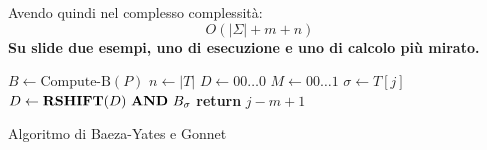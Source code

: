 \documentclass[a4paper,12pt, oneside]{book}
\begin{document}
Avendo quindi nel complesso complessità:
\[O(|\Sigma|+m+n)\]
\textbf{Su slide due esempi, uno di esecuzione e uno di calcolo più mirato.}
\begin{algorithm}
  \begin{algorithmic}
    \State $B\gets \mbox{Compute-B}(P)$
    \State $n\gets |T|$
    \State $D\gets 00\ldots 0$
    \State $M\gets 00\ldots 1$
    \State $\sigma\gets T[j]$
    \State $D\gets \mathbf{RSHIFT}(D)\mbox{ \textbf{AND} }B_\sigma$
    \State \textbf{return} $j-m+1$
    \EndIf
    \EndFor
    \EndFunction
  \end{algorithmic}
  \caption{Algoritmo di Baeza-Yates e Gonnet}
\end{algorithm}
\end{document}
